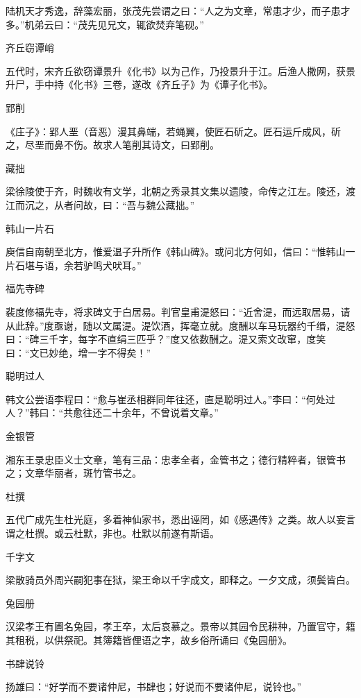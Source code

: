\documentclass[a4paper,12pt,UTF8,twoside]{ctexbook}
\begin{document}
    陆机天才秀逸，辞藻宏丽，张茂先尝谓之曰：“人之为文章，常患才少，而子患才多。”机弟云曰：“茂先见兄文，辄欲焚弃笔砚。”
    
    齐丘窃谭峭
    
    五代时，宋齐丘欲窃谭景升《化书》以为己作，乃投景升于江。后渔人撒网，获景升尸，手中持《化书》三卷，遂改《齐丘子》为《谭子化书》。
    
    郢削
    
    《庄子》：郢人垩（音恶）漫其鼻端，若蝇翼，使匠石斫之。匠石运斤成风，斫之，尽垩而鼻不伤。故求人笔削其诗文，曰郢削。
    
    藏拙
    
    梁徐陵使于齐，时魏收有文学，北朝之秀录其文集以遗陵，命传之江左。陵还，渡江而沉之，从者问故，曰：“吾与魏公藏拙。”
    
    韩山一片石
    
    庾信自南朝至北方，惟爱温子升所作《韩山碑》。或问北方何如，信曰：“惟韩山一片石堪与语，余若驴鸣犬吠耳。”
    
    福先寺碑
    
    裴度修福先寺，将求碑文于白居易。判官皇甫湜怒曰：“近舍湜，而远取居易，请从此辞。”度亟谢，随以文属湜。湜饮酒，挥毫立就。度酬以车马玩器约千缗，湜怒曰：“碑三千字，每字不直绢三匹乎？”度又依数酬之。湜又索文改窜，度笑曰：“文已妙绝，增一字不得矣！”
    
    聪明过人
    
    韩文公尝语李程曰：“愈与崔丞相群同年往还，直是聪明过人。”李曰：“何处过人？”韩曰：“共愈往还二十余年，不曾说着文章。”
    
    金银管
    
    湘东王录忠臣义士文章，笔有三品：忠孝全者，金管书之；德行精粹者，银管书之；文章华丽者，斑竹管书之。
    
    杜撰
    
    五代广成先生杜光庭，多着神仙家书，悉出诬罔，如《感遇传》之类。故人以妄言谓之杜撰。或云杜默，非也。杜默以前遂有斯语。
    
    千字文
    
    梁散骑员外周兴嗣犯事在狱，梁王命以千字成文，即释之。一夕文成，须鬓皆白。
    
    兔园册
    
    汉梁孝王有圃名兔园，孝王卒，太后哀慕之。景帝以其园令民耕种，乃置官守，籍其租税，以供祭祀。其簿籍皆俚语之字，故乡俗所诵曰《兔园册》。
    
    书肆说铃
    
    扬雄曰：“好学而不要诸仲尼，书肆也；好说而不要诸仲尼，说铃也。”
    
\end{document}
